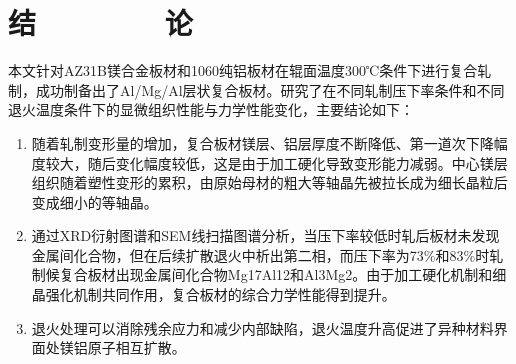 \section*{结\ \ \ \ \ \ \ \ 论}


	本文针对AZ31B镁合金板材和1060纯铝板材在辊面温度300℃条件下进行复合轧制，成功制备出了Al/Mg/Al层状复合板材。研究了在不同轧制压下率条件和不同退火温度条件下的显微组织性能与力学性能变化，主要结论如下：\par
	\begin{enumerate}
		\item 随着轧制变形量的增加，复合板材镁层、铝层厚度不断降低、第一道次下降幅度较大，随后变化幅度较低，这是由于加工硬化导致变形能力减弱。中心镁层组织随着塑性变形的累积，由原始母材的粗大等轴晶先被拉长成为细长晶粒后变成细小的等轴晶。
		
		\item 通过XRD衍射图谱和SEM线扫描图谱分析，当压下率较低时轧后板材未发现金属间化合物，但在后续扩散退火中析出第二相，而压下率为73$\%$和83$\%$时轧制候复合板材出现金属间化合物Mg17Al12和Al3Mg2。由于加工硬化机制和细晶强化机制共同作用，复合板材的综合力学性能得到提升。
		
		\item 退火处理可以消除残余应力和减少内部缺陷，退火温度升高促进了异种材料界面处镁铝原子相互扩散。 
				
	\end{enumerate}
	
